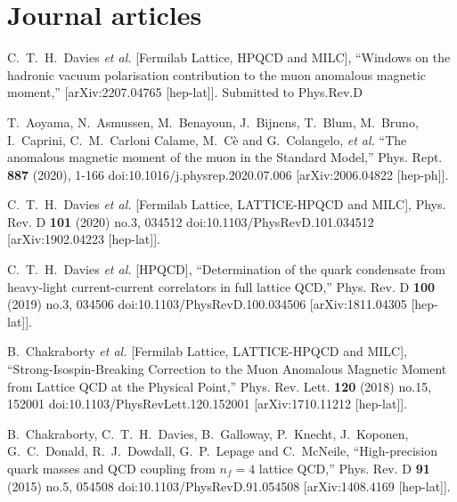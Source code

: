 \section{Journal articles}

\begin{thebibliography}{130}

C.~T.~H.~Davies \textit{et al.} [Fermilab Lattice, HPQCD and MILC],
``Windows on the hadronic vacuum polarisation contribution to the
muon anomalous magnetic moment,''
[arXiv:2207.04765 [hep-lat]]. Submitted to Phys.Rev.D

T.~Aoyama, N.~Asmussen, M.~Benayoun, J.~Bijnens, T.~Blum, M.~Bruno,
I.~Caprini, C.~M.~Carloni Calame, M.~C\`e and G.~Colangelo, \textit{et
  al.}
``The anomalous magnetic moment of the muon in the Standard Model,''
Phys. Rept. \textbf{887} (2020), 1-166
doi:10.1016/j.physrep.2020.07.006
[arXiv:2006.04822 [hep-ph]].

C.~T.~H.~Davies \textit{et al.} [Fermilab Lattice, LATTICE-HPQCD and
  MILC],
Phys. Rev. D \textbf{101} (2020) no.3, 034512
doi:10.1103/PhysRevD.101.034512
[arXiv:1902.04223 [hep-lat]].

C.~T.~H.~Davies \textit{et al.} [HPQCD],
``Determination of the quark condensate from heavy-light
current-current correlators in full lattice QCD,''
Phys. Rev. D \textbf{100} (2019) no.3, 034506
doi:10.1103/PhysRevD.100.034506
[arXiv:1811.04305 [hep-lat]].

B.~Chakraborty \textit{et al.} [Fermilab Lattice, LATTICE-HPQCD and
  MILC],
``Strong-Isospin-Breaking Correction to the Muon Anomalous Magnetic
Moment from Lattice QCD at the Physical Point,''
Phys. Rev. Lett. \textbf{120} (2018) no.15, 152001
doi:10.1103/PhysRevLett.120.152001
[arXiv:1710.11212 [hep-lat]].

B.~Chakraborty, C.~T.~H.~Davies, B.~Galloway, P.~Knecht, J.~Koponen,
G.~C.~Donald, R.~J.~Dowdall, G.~P.~Lepage and C.~McNeile,
``High-precision quark masses and QCD coupling from $n_f=4$ lattice
QCD,''
Phys. Rev. D \textbf{91} (2015) no.5, 054508
doi:10.1103/PhysRevD.91.054508
[arXiv:1408.4169 [hep-lat]].


\end{thebibliography}
